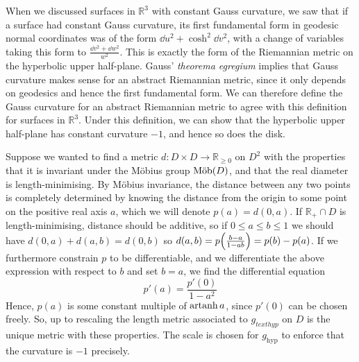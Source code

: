 \begin{remark}
	When we discussed surfaces in \( \mathbb R^3 \) with constant Gauss curvature, we saw that if a surface had constant Gauss curvature, its first fundamental form in geodesic normal coordinates was of the form \( \dd{u}^2 + \cosh^2 \dd{v}^2 \), with a change of variables taking this form to \( \frac{\dd{v}^2 + \dd{w}^2}{w^2} \).
	This is exactly the form of the Riemannian metric on the hyperbolic upper half-plane.
	Gauss' \textit{theorema egregium} implies that Gauss curvature makes sense for an abstract Riemannian metric, since it only depends on geodesics and hence the first fundamental form.
	We can therefore define the Gauss curvature for an abstract Riemannian metric to agree with this definition for surfaces in \( \mathbb R^3 \).
	Under this definition, we can show that the hyperbolic upper half-plane has constant curvature \( -1 \), and hence so does the disk.

	Suppose we wanted to find a metric \( d \colon D \times D \to \mathbb R_{\geq 0} \) on \( D^2 \) with the properties that it is invariant under the M\"obius group \( \text{M\"ob}(D) \), and that the real diameter is length-minimising.
	By M\"obius invariance, the distance between any two points is completely determined by knowing the distance from the origin to some point on the positive real axis \( a \), which we will denote \( p(a) = d(0,a) \).
	If \( \mathbb R_+ \cap D \) is length-minimising, distance should be additive, so if \( 0 \leq a \leq b \leq 1 \) we should have \( d(0,a) + d(a,b) = d(0,b) \) so \( d(a,b) = p\qty(\frac{b-a}{1-ab}) = p(b) - p(a) \).
	If we furthermore constrain \( p \) to be differentiable, and we differentiate the above expression with respect to \( b \) and set \( b = a \), we find the differential equation
	\[ p'(a) = \frac{p'(0)}{1-a^2} \]
	Hence, \( p(a) \) is some constant multiple of \( \operatorname{artanh} a \), since \( p'(0) \) can be chosen freely.
	So, up to rescaling the length metric associated to \( g_{text{hyp}} \) on \( D \) is the unique metric with these properties.
	The scale is chosen for \( g_{\text{hyp}} \) to enforce that the curvature is \( -1 \) precisely.
\end{remark}

